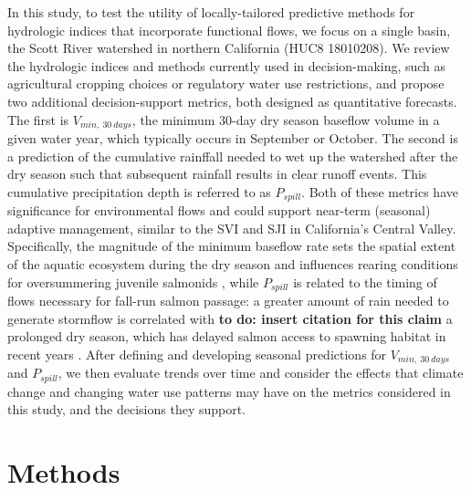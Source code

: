\documentclass[hess, manuscript]{copernicus}
\begin{document}
In this study, to test the utility of locally-tailored predictive
methods for hydrologic indices that incorporate functional flows, we
focus on a single basin, the Scott River watershed in northern
California (HUC8 18010208). We review the hydrologic indices and methods
currently used in decision-making, such as agricultural cropping choices
or regulatory water use restrictions, and propose two additional
decision-support metrics, both designed as quantitative forecasts. The
first is \(V_{min,~30~days}\), the minimum 30-day dry season baseflow
volume in a given water year, which typically occurs in September or
October. The second is a prediction of the cumulative rainffall needed
to wet up the watershed after the dry season such that subsequent
rainfall results in clear runoff events. This cumulative precipitation
depth is referred to as \(P_{spill}\). Both of these metrics have
significance for environmental flows and could support near-term
(seasonal) adaptive management, similar to the SVI and SJI in
California's Central Valley. Specifically, the magnitude of the minimum
baseflow rate sets the spatial extent of the aquatic ecosystem during
the dry season and influences rearing conditions for oversummering
juvenile salmonids \citep{Gorman2016}, while \(P_{spill}\) is related to
the timing of flows necessary for fall-run salmon passage: a greater
amount of rain needed to generate stormflow is correlated with
\textbf{to do: insert citation for this claim} a prolonged dry season,
which has delayed salmon access to spawning habitat in recent years
\citeyearpar[CDFW][]{CDFW2015a}. After defining and developing seasonal
predictions for \(V_{min,~30~days}\) and \(P_{spill}\), we then evaluate
trends over time and consider the effects that climate change and
changing water use patterns may have on the metrics considered in this
study, and the decisions they support.

\section{Methods}
\end{document}
